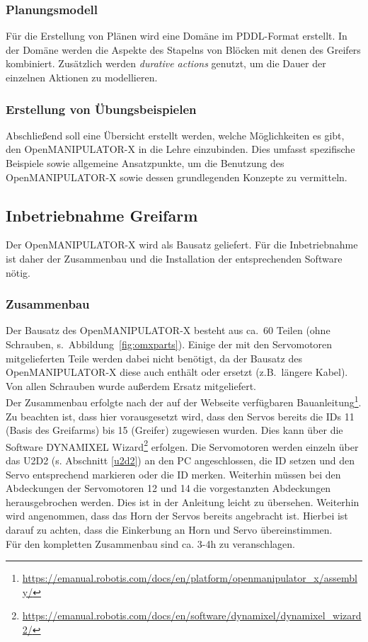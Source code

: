 \subsubsection{Planungsmodell}{\label{konzept:planningmodel}}
Für die Erstellung von Plänen wird eine Domäne im \ac{PDDL}-Format erstellt.
In der Domäne werden die Aspekte des Stapelns von Blöcken mit denen des Greifers kombiniert.
Zusätzlich werden \emph{durative actions} genutzt, um die Dauer der einzelnen Aktionen zu modellieren.
\subsubsection{Erstellung von Übungsbeispielen}{\label{konzept:exercise}}
Abschließend soll eine Übersicht erstellt werden, welche Möglichkeiten es gibt, den OpenMANIPULATOR-X in die Lehre einzubinden.
Dies umfasst spezifische Beispiele sowie allgemeine Ansatzpunkte, um die Benutzung des OpenMANIPULATOR-X sowie dessen grundlegenden Konzepte zu vermitteln.

\subsection {Inbetriebnahme Greifarm}
Der OpenMANIPULATOR-X wird als Bausatz geliefert.
Für die Inbetriebnahme ist daher der Zusammenbau und die Installation der entsprechenden Software nötig.
\subsubsection{Zusammenbau}
Der Bausatz des OpenMANIPULATOR-X besteht aus ca.\ 60 Teilen (ohne Schrauben, s.\ Abbildung~\ref{fig:omxparts}).
Einige der mit den Servomotoren mitgelieferten Teile werden dabei nicht benötigt, da der Bausatz des OpenMANIPULATOR-X diese auch enthält oder ersetzt (z.B.\ längere Kabel).
Von allen Schrauben wurde außerdem Ersatz mitgeliefert.\\
Der Zusammenbau erfolgte nach der auf der Webseite verfügbaren Bauanleitung\footnote{\url{https://emanual.robotis.com/docs/en/platform/openmanipulator_x/assembly/}}.
Zu beachten ist, dass hier vorausgesetzt wird, dass den Servos bereits die IDs 11 (Basis des Greifarms) bis 15 (Greifer) zugewiesen wurden.
Dies kann über die Software DYNAMIXEL Wizard{\footnote{\url{https://emanual.robotis.com/docs/en/software/dynamixel/dynamixel_wizard2/}}} erfolgen.
Die Servomotoren werden einzeln über das U2D2 (s. Abschnitt {\ref{u2d2}}) an den PC angeschlossen, die ID setzen und den Servo entsprechend markieren oder die ID merken.
Weiterhin müssen bei den Abdeckungen der Servomotoren 12 und 14 die vorgestanzten Abdeckungen herausgebrochen werden.
Dies ist in der Anleitung leicht zu übersehen.
Weiterhin wird angenommen, dass das Horn der Servos bereits angebracht ist.
Hierbei ist darauf zu achten, dass die Einkerbung an Horn und Servo übereinstimmen.\\
Für den kompletten Zusammenbau sind ca. 3-4h zu veranschlagen.

